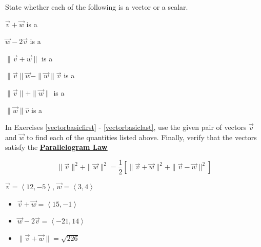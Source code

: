 \documentclass{ximera}
\begin{document}
	\author{Stitz-Zeager}


\begin{question}
State whether each of the following is a vector or a scalar.  

$\overrightarrow{v} + \overrightarrow{w}$ is a 

$\overrightarrow{w}  - 2\overrightarrow{v}$ is a 

$\| \overrightarrow{v} + \overrightarrow{w} \|$ is a 

$\| \overrightarrow{v} \| \overrightarrow{w} - \| \overrightarrow{w} \| \overrightarrow{v}$ is a 

$\| \overrightarrow{v} \| + \| \overrightarrow{w}\|$ is a 

$\|\overrightarrow{w}\| \hat{v}$ is a 

In Exercises \ref{vectorbasicfirst} - \ref{vectorbasiclast}, use the given pair of vectors $\overrightarrow{v}$ and $\overrightarrow{w}$ to find each of the quantities listed above.  
Finally, verify that the vectors satisfy the \href{http://en.wikipedia.org/wiki/Parallelogram_law}{\underline{\textbf{Parallelogram Law}}}

\[ \|\overrightarrow{v}\|^2 + \|\overrightarrow{w}\|^2 = \frac{1}{2}\left[ \| \overrightarrow{v} + \overrightarrow{w}\|^2 + \|\overrightarrow{v} - \overrightarrow{w}\|^2\right] \]


\begin{problem} \label{vectorbasicfirst}
$\overrightarrow{v} = \left<12, -5\right>$, $\overrightarrow{w} = \left<3, 4\right>$ 

 \begin{solution}
\begin{itemize}
\item  $\overrightarrow{v} + \overrightarrow{w} = \left<15,-1 \right> $

\item  $\overrightarrow{w}  - 2\overrightarrow{v}  = \left<-21,14 \right>$

\item $\| \overrightarrow{v} + \overrightarrow{w} \| = \sqrt{226}$


\end{itemize}
\end{solution}
\end{problem}
\end{question}
\end{document}
